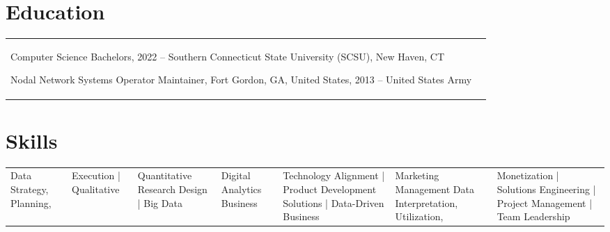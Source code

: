 \documentclass[a4paper,12pt]{article}
\begin{document}
\section{Education}
\begin{tabularx}{\linewidth}{@{}l X@{}}	
Computer Science Bachelors, 2022 – Southern Connecticut State University (SCSU), New Haven, CT

Nodal Network Systems Operator Maintainer, Fort Gordon, GA, United States, 2013 – United States Army

\end{tabularx}


\section{Skills}
\begin{tabularx}{\linewidth}{@{}l X@{}}
Data Strategy, Planning, & Execution | Qualitative & Quantitative Research Design | Big Data & Digital Analytics
Business & Technology Alignment | Product Development Solutions | Data-Driven Business & Marketing Management
Data Interpretation, Utilization, & Monetization | Solutions Engineering | Project Management | Team Leadership

\end{tabularx}

\vfill
{}
\end{document}
